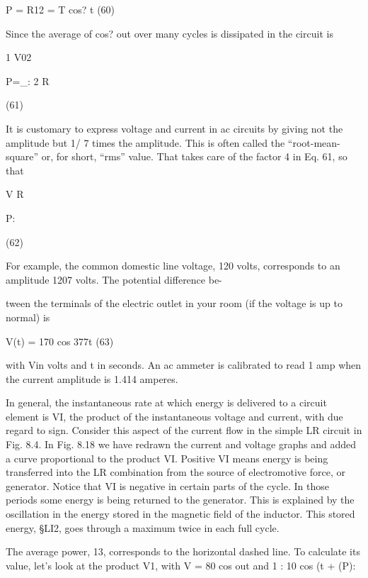 \begin{equation}
\end{equation}
P = R12 = T cos? \omega t (60)

Since the average of cos? out over many cycles is %
dissipated in the circuit is

\begin{equation}
\end{equation}
1 V02

P=_:
2 R

(61)

It is customary to express voltage and current in ac circuits by giving
not the amplitude but 1/ \/7 times the amplitude. This is often called
the ``root-mean-square'' or, for short, ``rms'' value. That takes care
of the factor 4 in Eq. 61, so that

\begin{equation}
\end{equation}
V%
R

P:

(62)

For example, the common domestic line voltage, 120 volts, corresponds
to an amplitude 120\/7 volts. The potential difference be-

tween the terminals of the electric outlet in your room (if the voltage
is up to normal) is

\begin{equation}
\end{equation}
V(t) = 170 cos 377t (63)

with Vin volts and t in seconds. An ac ammeter is calibrated to read
1 amp when the current amplitude is 1.414 amperes.

In general, the instantaneous rate at which energy is delivered to
a circuit element is VI, the product of the instantaneous voltage and
current, with due regard to sign. Consider this aspect of the current
flow in the simple LR circuit in Fig. 8.4. In Fig. 8.18 we have redrawn
the current and voltage graphs and added a curve proportional to
the product VI. Positive VI means energy is being transferred into
the LR combination from the source of electromotive force, or
generator. Notice that VI is negative in certain parts of the cycle.
In those periods some energy is being returned to the generator.
This is explained by the oscillation in the energy stored in the magnetic
field of the inductor. This stored energy, §LI2, goes through
a maximum twice in each full cycle.

The average power, 13, corresponds to the horizontal dashed line.
To calculate its value, let's look at the product V1, with V = 80 cos out
and 1 : 10 cos (\omega t + (P):


